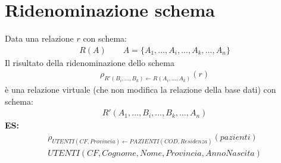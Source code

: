 \section{Ridenominazione schema}
Data una relazione $r$ con schema:
    \begin{equation}\begin{aligned}
        R(A) \qquad A = \{  A_1, ..., A_i, ..., A_k, ..., A_n   \}
    \end{aligned}\end{equation}
Il risultato della ridenominazione dello schema 
    \begin{equation}\begin{aligned}
        \rho_{R'(B_i, ..., B_k) \leftarrow R(A_i, ..., A_k)} (r)
    \end{aligned}\end{equation}
è una relazione virtuale (che non modifica la relazione della base dati) con schema:
    \begin{equation}\begin{aligned}
        R'(A_1, ..., B_i, ..., B_k, ..., A_n)
    \end{aligned}\end{equation}
\textbf{ES:} 
    \begin{equation}\begin{aligned}
        \rho_{UTENTI(CF, Provincia) \leftarrow PAZIENTI(COD, Residenza)}(pazienti)\\
        UTENTI(CF, Cognome, Nome, Provincia, AnnoNascita)
    \end{aligned}\end{equation}

